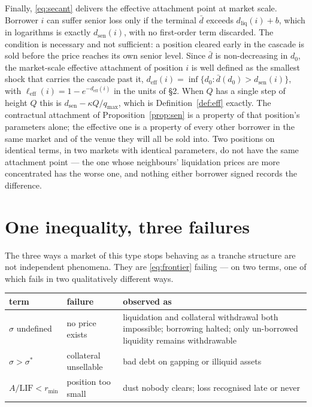 \documentclass[11pt,a4paper]{article}
\theoremstyle{plain}
\theoremstyle{definition}
\theoremstyle{remark}
\newcommand{\LIF}{\mathrm{LIF}}
\begin{document}
Finally, \eqref{eq:secant} delivers the effective attachment point at market scale. Borrower $i$
can suffer senior loss only if the terminal $\bar d$ exceeds $d_{\mathrm{liq}}(i)+b$, which in
logarithms is exactly $d_{\mathrm{sen}}(i)$, with no first-order term discarded. The condition is
necessary and not sufficient: a position cleared early in the cascade is sold before the price
reaches its own senior level. Since $\bar d$ is non-decreasing in $d_0$, the market-scale effective
attachment of position $i$ is well defined as the smallest shock that carries the cascade past it,
$d_{\mathrm{eff}}(i)=\inf\{d_0 : \bar d(d_0) > d_{\mathrm{sen}}(i)\}$, with
$\ell_{\mathrm{eff}}(i)=1-e^{-d_{\mathrm{eff}}(i)}$ in the units of \S2. When $Q$ has a single step
of height $Q$ this is $d_{\mathrm{sen}}-\kappa Q/q_{\max}$, which is Definition~\ref{def:eff}
exactly. The contractual attachment of
Proposition~\ref{prop:sen} is a property of that position's parameters alone; the effective one is
a property of every other borrower
in the same market and of the venue they will all be sold into. Two positions on identical terms,
in two markets with identical parameters, do not have the same attachment point --- the one whose
neighbours' liquidation prices are more concentrated has the worse one, and nothing either
borrower signed records the difference.

\section{One inequality, three failures}

The three ways a market of this type stops behaving as a tranche structure are not independent
phenomena. They are \eqref{eq:frontier} failing --- on two terms, one of which fails in two
qualitatively different ways.

\begin{table}[h]\centering
\begin{tabular}{@{}l l p{5.4cm}@{}}
\toprule
\textbf{term} & \textbf{failure} & \textbf{observed as} \\
\midrule
$\sigma$ undefined & no price exists & liquidation and collateral withdrawal both impossible;
borrowing halted; only un-borrowed liquidity remains withdrawable \\
$\sigma>\sigma^{*}$ & collateral unsellable & bad debt on gapping or illiquid assets \\
$A/\LIF<r_{\min}$ & position too small & dust nobody clears; loss recognised late or never \\
\bottomrule
\end{tabular}
\end{table}
\end{document}
